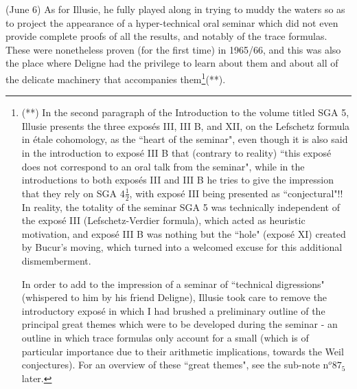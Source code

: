 (June 6) As for Illusie, he fully played along in trying to muddy the waters so as to project the appearance of a hyper-technical oral seminar which did not even provide complete proofs of all the results, and notably of the trace formulas. These were nonetheless proven (for the first time) in 1965/66, and this was also the place where Deligne had the privilege to learn about them and about all of the delicate machinery that accompanies them\footnote{(**) In the second paragraph of the Introduction to the volume titled SGA 5, Illusie presents the three expos\'es III, III B, and XII, on the Lefschetz formula in \'etale cohomology, as the ``heart of the seminar", even though it is also said in the introduction to expos\'e III B that (contrary to reality) ``this expos\'e does not correspond to an oral talk from the seminar", while in the introductions to both expos\'es III and III B he tries to give the impression that they rely on SGA 4$\frac{1}{2}$, with expos\'e III being presented as ``conjectural"!! In reality, the totality of the seminar SGA 5 was technically independent of the expos\'e III (Lefschetz-Verdier formula), which acted as heuristic motivation, and expos\'e III B was nothing but the ``hole" (expos\'e XI) created by Bucur's moving, which turned into a welcomed excuse for this additional dismemberment.

In order to add to the impression of a seminar of ``technical digressions" (whispered to him by his friend Deligne), Illusie took care to remove the introductory expos\'e in which I had brushed a preliminary outline of the principal great themes which were to be developed during the seminar - an outline in which trace formulas only account for a small (which is of particular importance due to their arithmetic implications, towards the Weil conjectures). For an overview of these ``great themes", see the sub-note n$^o 87_5$ later.}(**).


